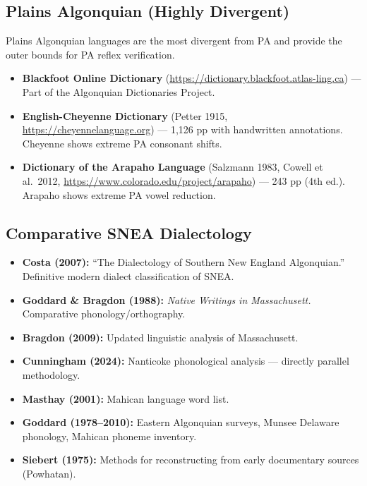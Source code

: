 \subsection{Plains Algonquian (Highly Divergent)}

Plains Algonquian languages are the most divergent from PA and provide the
outer bounds for PA reflex verification.

\begin{itemize}
  \item \textbf{Blackfoot Online Dictionary}
    (\url{https://dictionary.blackfoot.atlas-ling.ca}) --- Part of the
    Algonquian Dictionaries Project.
  \item \textbf{English-Cheyenne Dictionary} (Petter 1915,
    \url{https://cheyennelanguage.org}) --- 1,126 pp with handwritten
    annotations. Cheyenne shows extreme PA consonant shifts.
  \item \textbf{Dictionary of the Arapaho Language} (Salzmann 1983, Cowell
    et al.\ 2012, \url{https://www.colorado.edu/project/arapaho}) --- 243 pp
    (4th ed.). Arapaho shows extreme PA vowel reduction.
\end{itemize}

\subsection{Comparative SNEA Dialectology}

\begin{itemize}
  \item \textbf{Costa (2007):} ``The Dialectology of Southern New England
    Algonquian.'' Definitive modern dialect classification of SNEA.
  \item \textbf{Goddard \& Bragdon (1988):} \emph{Native Writings in
    Massachusett.} Comparative phonology/orthography.
  \item \textbf{Bragdon (2009):} Updated linguistic analysis of Massachusett.
  \item \textbf{Cunningham (2024):} Nanticoke phonological analysis ---
    directly parallel methodology.
  \item \textbf{Masthay (2001):} Mahican language word list.
  \item \textbf{Goddard (1978--2010):} Eastern Algonquian surveys, Munsee
    Delaware phonology, Mahican phoneme inventory.
  \item \textbf{Siebert (1975):} Methods for reconstructing from early
    documentary sources (Powhatan).
\end{itemize}
